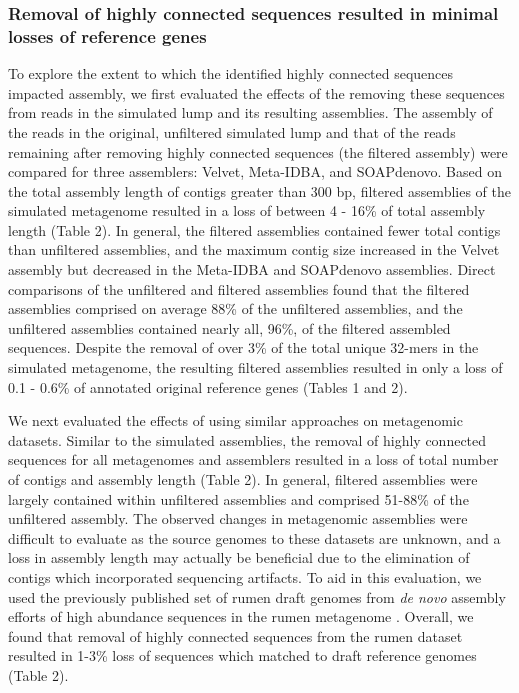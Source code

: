 \documentclass[10pt]{article}
\begin{document}
\subsubsection*{Removal of highly connected sequences resulted in minimal losses of reference genes}
To explore the extent to which the identified highly connected sequences impacted assembly, we first evaluated the effects of the removing these sequences from reads in the simulated lump and its resulting assemblies.  The assembly of the reads in the original, unfiltered simulated lump and that of the reads remaining after removing highly connected sequences (the filtered assembly) were compared for three assemblers:  Velvet, Meta-IDBA, and SOAPdenovo.  Based on the total assembly length of contigs greater than 300 bp, filtered assemblies of the simulated metagenome resulted in a loss of between 4 - 16\% of total assembly length (Table 2).   In general, the filtered assemblies contained fewer total contigs than unfiltered assemblies, and the maximum contig size increased in the Velvet assembly but decreased in the Meta-IDBA and SOAPdenovo assemblies.  Direct comparisons of the unfiltered and filtered assemblies found that the filtered assemblies comprised on average 88\% of the unfiltered assemblies, and the unfiltered assemblies contained nearly all, 96\%, of the filtered assembled sequences.  Despite the removal of over 3\% of the total unique 32-mers in the simulated metagenome, the resulting filtered assemblies resulted in only a loss of 0.1 - 0.6\% of annotated original reference genes (Tables 1 and 2). 

We next evaluated the effects of using similar approaches on metagenomic datasets.  Similar to the simulated assemblies, the removal of highly connected sequences for all metagenomes and assemblers resulted in a loss of total number of contigs and assembly length (Table 2).  In general, filtered assemblies were largely contained within unfiltered assemblies and comprised 51-88\% of the unfiltered assembly.   The observed changes in metagenomic assemblies were difficult to evaluate as the source genomes to these datasets are unknown, and a loss in assembly length may actually be beneficial due to the elimination of contigs which incorporated sequencing artifacts.  To aid in this evaluation, we used the previously published set of rumen draft genomes from \emph{de novo} assembly efforts of high abundance sequences in the rumen metagenome \cite{Hess:2011p686}.  Overall, we found that removal of highly connected sequences from the rumen dataset resulted in 1-3\% loss of sequences which matched to draft reference genomes (Table 2).
\end{document}

